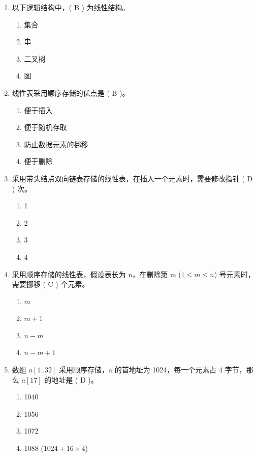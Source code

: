 \documentclass[12pt, a4paper]{article}
\begin{document}
\begin{enumerate}[label=\arabic*.]
    \item 以下逻辑结构中，( B ) 为线性结构。
    \begin{enumerate}
        \item 集合
        \item 串
        \item 二叉树
        \item 图
    \end{enumerate}

    \item 线性表采用顺序存储的优点是 ( B )。
    \begin{enumerate}
        \item 便于插入
        \item 便于随机存取
        \item 防止数据元素的挪移
        \item 便于删除
    \end{enumerate}

    \item 采用带头结点双向链表存储的线性表，在插入一个元素时，需要修改指针 ( D ) 次。
    \begin{enumerate}
        \item 1
        \item 2
        \item 3
        \item 4
    \end{enumerate}

    \item 采用顺序存储的线性表，假设表长为 n，在删除第 m ($1 \le m \le n$) 号元素时，需要挪移 ( C ) 个元素。
    \begin{enumerate}
        \item $m$
        \item $m+1$
        \item $n-m$
        \item $n-m+1$
    \end{enumerate}

    \item 数组 $a[1..32]$ 采用顺序存储，a 的首地址为 1024，每一个元素占 4 字节，那么 $a[17]$ 的地址是 ( D )。
    \begin{enumerate}
        \item 1040
        \item 1056
        \item 1072
        \item 1088 ($1024 + 16 \times 4$)
    \end{enumerate}


\end{enumerate}
\end{document}
